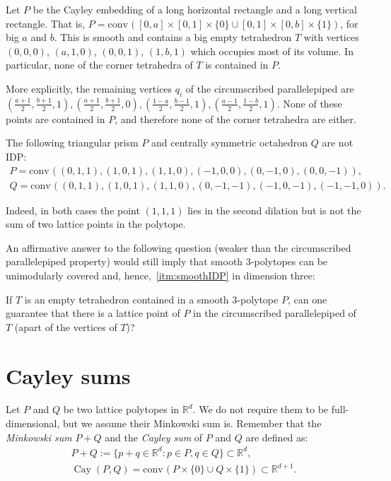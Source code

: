 \documentclass[12pt]{article}
\newcommand{\R}{ \ensuremath{\mathbb{R}}}
\newcommand{\conv}{\ensuremath{\mathrm{conv}}\hspace{1pt}}
\newcommand{\cayley}{\operatorname{Cay}}
\begin{document}
\begin{example}
 Let $P$ be the Cayley embedding of a long horizontal rectangle and a long vertical rectangle. That is,
$P=\conv([0,a]\times [0,1] \times\{0\} \cup [0,1]\times [0,b] \times\{1\})$, for big $a$ and $b$. This is smooth and contains a big empty tetrahedron $T$ with vertices $(0,0,0)$, $(a,1,0)$, $(0,0,1)$, $(1,b,1)$ which occupies most of its volume. In particular, none of the corner tetrahedra of $T$ is contained in $P$. 

More explicitly, the remaining vertices $q_i$ of the circumscribed parallelepiped are $(\frac{a+1}{2}, \frac{b+1}{2}, 1), (\frac{a+1}{2}, \frac{b+1}{2}, 0), (\frac{1-a}{2}, \frac{b-1}{2}, 1), (\frac{a-1}{2}, \frac{1-b}{2}, 1)$. None of these points are contained in $P$, and therefore none of the corner tetrahedra are either.
\end{example}


\begin{example}
\label{ex:non-IDP}
The following triangular prism $P$ and centrally symmetric octahedron $Q$ are not IDP:
\begin{gather}
P=\conv((0,1,1),(1,0,1),(1,1,0),(-1,0,0),(0,-1,0),(0,0,-1)),\\
Q= \conv((0,1,1),(1,0,1),(1,1,0),(0,-1,-1),(-1,0,-1),(-1,-1,0)).
\end{gather}

Indeed, in both cases the 
point $(1,1,1)$ lies in the second dilation but is not the sum of two lattice points in the polytope. 
\end{example}

An affirmative answer to the following question (weaker than the circumscribed parallelepiped property) would still  imply that smooth $3$-polytopes can be unimodularly covered and, hence,~\eqref{itm:smoothIDP} in dimension three:

\begin{question}
If $T$ is an empty tetrahedron contained in a smooth 3-polytope $P$, can one guarantee that there is a lattice point of $P$ in the circumscribed parallelepiped of $T$ (apart of the vertices of $T$)?
\end{question}




\section{ Cayley sums}
\label{sec:cayley}
Let $P$ and $Q$ be two lattice polytopes in $\R^d$. We do not require them to be full-dimensional, but we assume their Minkowski sum is. Remember that the \emph{Minkowski sum} $P+Q$ and the \emph{Cayley sum} of $P$ and $Q$ are defined as:
\begin{gather*}
P + Q := \{ p+q \in \R^d: p\in P, q \in Q\} \subset \R^d,\\
\cayley (P,Q) = \conv( P\times\{0\} \cup Q\times \{1\}) \subset \R^{d+1}.
\end{gather*}
\end{document}
